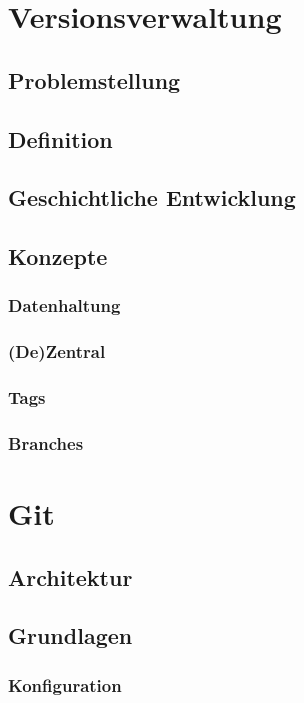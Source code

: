\chapter{Versionsverwaltung}
\label{cha:Versionsverwaltung}
\section{Problemstellung}
\label{sec:Problemstellung}
\section{Definition}
\label{sec:Definition}
\section{Geschichtliche Entwicklung}
\label{sec:GeschichtlicheEntwicklung}
\section{Konzepte}
\label{sec:Konzepte}
\subsection{Datenhaltung}
\label{sec:Datenhaltung}
\subsection{(De)Zentral}
\label{sec:dezentral}
\subsection{Tags}
\label{sec:Tags}
\subsection{Branches}
\label{sec:Branches}

\chapter{Git}
\label{cha:Git}
\section{Architektur}
\label{sec:Architektur}
\section{Grundlagen}
\label{sec:Grundlagen}
\subsection{Konfiguration}
\label{sec:Konfiguration}
